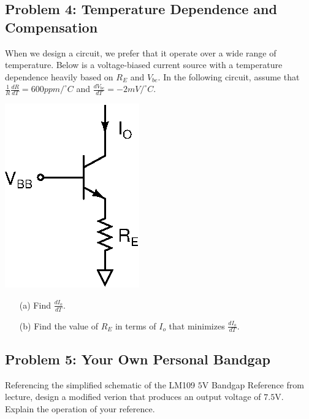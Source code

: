 \documentclass[11pt,twoside]{article}
\begin{document}
\subsection*{Problem 4: Temperature Dependence and Compensation}
When we design a circuit, we prefer that it operate over a wide range of temperature.
Below is a voltage-biased current source with a temperature dependence heavily based on $R_E$ and $V_{be}$.
In the following circuit, assume that $\frac{1}{R} \frac{dR}{dT}=600ppm/^{\circ}C$ and $\frac{dV_{be}}{dT}=-2mV/^{\circ}C$. \\
\vspace{1ex}

\begin{center}
\includegraphics[width=.25\textwidth]{temp-dep.eps}
\end{center}

\begin{enumerate}
	\item[(a)] Find $\frac{dI_o}{dT}$.
	\item[(b)] Find the value of $R_E$ in terms of $I_o$ that minimizes $\frac{dI_o}{dT}$.

\end{enumerate}

\subsection*{Problem 5: Your Own Personal Bandgap}
Referencing the simplified schematic of the LM109 $5$V Bandgap Reference from lecture, design a modified verion that produces an output voltage of $7.5$V.\\
\vspace{2ex}
Explain the operation of your reference.
\end{document}
